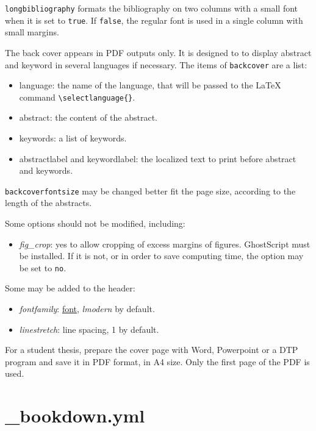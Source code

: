 \documentclass[
  12pt,
  american,
  a4paper,
  extrafontsizes,onecolumn,openright
  ]{memoir}
\providecommand{\tightlist}{%
  \setlength{\itemsep}{0pt}\setlength{\parskip}{0pt}}
\newlength{\rf}
\begin{document}
\texttt{longbibliography} formats the bibliography on two columns with a small font when it is set to \texttt{true}.
If \texttt{false}, the regular font is used in a single column with small margins.

The back cover appears in PDF outputs only.
It is designed to to display abstract and keyword in several languages if necessary.
The items of \texttt{backcover} are a list:

\begin{itemize}
\tightlist
\item
  language: the name of the language, that will be passed to the LaTeX command \texttt{\textbackslash{}selectlanguage\{\}}.
\item
  abstract: the content of the abstract.
\item
  keywords: a list of keywords.
\item
  abstractlabel and keywordlabel: the localized text to print before abstract and keywords.
\end{itemize}

\texttt{backcoverfontsize} may be changed better fit the page size, according to the length of the abstracts.

Some options should not be modified, including:

\begin{itemize}
\tightlist
\item
  \emph{fig\_crop}: yes to allow cropping of excess margins of figures.
  GhostScript must be installed.
  If it is not, or in order to save computing time, the option may be set to \texttt{no}.
\end{itemize}

Some may be added to the header:

\begin{itemize}
\tightlist
\item
  \emph{fontfamily}: \href{https://en.wikibooks.org/wiki/LaTeX/Fonts\#Font_families}{font}, \emph{lmodern} by default.
\item
  \emph{linestretch}: line spacing, 1 by default.
\end{itemize}

For a student thesis, prepare the cover page with Word, Powerpoint or a DTP program and save it in PDF format, in A4 size.
Only the first page of the PDF is used.

\hypertarget{bookdown.yml}{%
\section{\_bookdown.yml}\label{bookdown.yml}}
\end{document}
